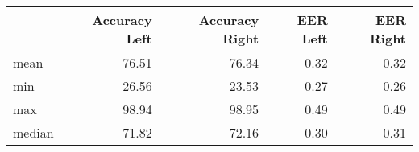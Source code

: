 \begin{tabular}{lrrrr}
\toprule
{} &  Accuracy Left &  Accuracy Right &  EER Left &  EER Right \\
\midrule
mean   &          76.51 &           76.34 &      0.32 &       0.32 \\
min    &          26.56 &           23.53 &      0.27 &       0.26 \\
max    &          98.94 &           98.95 &      0.49 &       0.49 \\
median &          71.82 &           72.16 &      0.30 &       0.31 \\
\bottomrule
\end{tabular}
